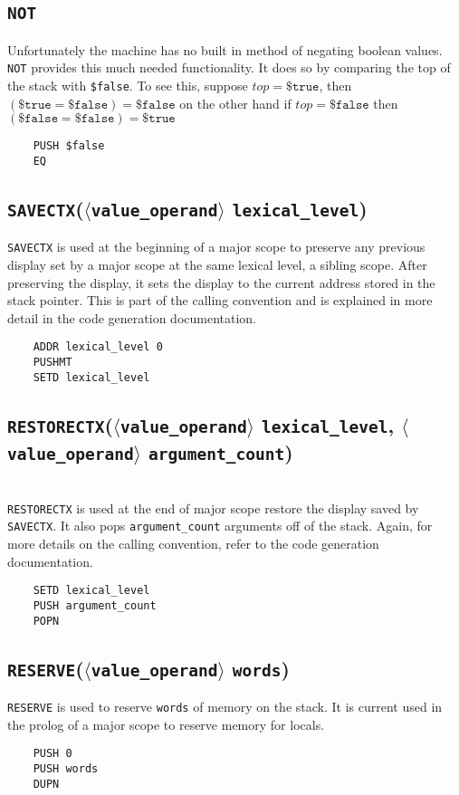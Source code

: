 \documentclass[oneside]{amsart}
\theoremstyle{definition}
\theoremstyle{remark}
\numberwithin{equation}{section}
\begin{document}
\subsection{\texttt{NOT}}
Unfortunately the machine has no built in method of negating boolean values. \texttt{NOT} provides
this much needed functionality. It does so by comparing the top of the stack with \texttt{\$false}.
To see this, suppose $top = \texttt{\$true}$, then $(\texttt{\$true} = \texttt{\$false}) =
\texttt{\$false}$ on the other hand if $top = \texttt{\$false}$ then $(\texttt{\$false} =
\texttt{\$false}) = \texttt{\$true}$
\begin{lstlisting}
    PUSH $false
    EQ
\end{lstlisting}

\newpage

\subsection{\texttt{SAVECTX}(\texttt{$\langle$value_operand$\rangle$} \texttt{lexical_level})}
\texttt{SAVECTX} is used at the beginning of a major scope to preserve any previous display set by
a major scope at the same lexical level, a sibling scope. After preserving the display, it sets the
display to the current address stored in the stack pointer. This is part of the calling convention
and is explained in more detail in the code generation documentation.
\begin{lstlisting}
    ADDR lexical_level 0
    PUSHMT
    SETD lexical_level
\end{lstlisting}
\subsection{\texttt{RESTORECTX}(\texttt{$\langle$value_operand$\rangle$} \texttt{lexical_level},
\texttt{$\langle$value_operand$\rangle$} \texttt{argument_count})} \ \\
\texttt{RESTORECTX} is used at the end of major scope restore the display saved by \texttt{SAVECTX}.
It also pops \texttt{argument_count} arguments off of the stack. Again, for more details on the
calling convention, refer to the code generation documentation.
\begin{lstlisting}
    SETD lexical_level
    PUSH argument_count
    POPN
\end{lstlisting}
\subsection{\texttt{RESERVE}(\texttt{$\langle$value_operand$\rangle$} \texttt{words})}
\texttt{RESERVE} is used to reserve \texttt{words} of memory on the stack. It is current used in the
prolog of a major scope to reserve memory for locals.
\begin{lstlisting}
    PUSH 0
    PUSH words
    DUPN
\end{lstlisting}
\end{document}
